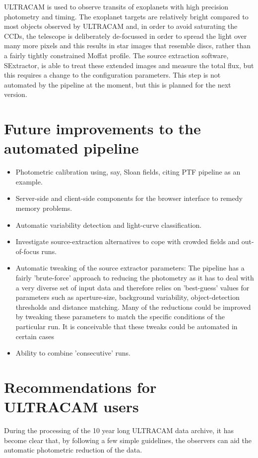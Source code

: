 ULTRACAM is used to observe transits of exoplanets with high precision photometry and timing. The exoplanet targets are relatively bright compared to most objects observed by ULTRACAM and, in order to avoid saturating the CCDs, the telescope is deliberately de-focussed in order to spread the light over many more pixels and this results in star images that resemble discs, rather than a fairly tightly constrained Moffat profile. The source extraction software, SExtractor, is able to treat these extended images and measure the total flux, but this requires a change to the configuration parameters. This step is not automated by the pipeline at the moment, but this is planned for the next version. 

\section{Future improvements to the automated pipeline}
\begin{itemize}
	\item Photometric calibration using, say, Sloan fields, citing PTF pipeline as an example.
	\item Server-side and client-side components for the browser interface to remedy memory problems.
	\item Automatic variability detection and light-curve classification. 
	\item Investigate source-extraction alternatives to cope with crowded fields and out-of-focus runs.
	\item Automatic tweaking of the source extractor parameters: The pipeline has a fairly 'brute-force' approach to reducing the photometry as it has to deal with a very diverse set of input data and therefore relies on 'best-guess' values for parameters such as aperture-size, background variability, object-detection thresholds and distance matching. Many of the reductions could be improved by tweaking these parameters to match the specific conditions of the particular run. It is conceivable that these tweaks could be automated in certain cases
	\item Ability to combine 'consecutive' runs. 
\end{itemize} 
 
\section{Recommendations for ULTRACAM users}
During the processing of the 10 year long ULTRACAM data archive, it has become clear that, by following a few simple guidelines, the observers can aid the automatic photometric reduction of the data. 

